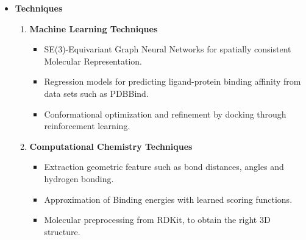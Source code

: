 \documentclass[12pt,a4]{report}
\begin{document}
\begin{itemize}
\begin{enumerate}
\vspace{0.3cm}
\item \textbf{Deployment \& Environment Tools}

\begin{itemize}
    \item \textbf{Docker and Kubernetes:} Support for scalable containerized GPUs deployments.
    \item \textbf{Streamlit:} Helps in the quick deployment of interactive AI web applications.
    \item \textbf{Linux (Ubuntu):} Development \& runtime environment for backend \& AI Models.
\end{itemize}

\vspace{0.3cm}
\item \textbf{Visualization and Documentation Tools}

\begin{itemize}
    \item \textbf{Py3Dmol:} Produces interactive 3D views of docked molecules.
    \item \textbf{Matplotlib / Plotly:} Plots affinity scores, RMSD and performance metrics.
    \item \textbf{LaTeX:} Formats reports and technical documentation, and publication-prepared materials.
\end{itemize}

\end{enumerate}

\vspace{0.5cm}
\item \textbf{Techniques}
\begin{enumerate}

\item \textbf{Machine Learning Techniques}
\begin{itemize}
    \item SE(3)-Equivariant Graph Neural Networks for spatially consistent Molecular Representation.
    \item Regression models for predicting ligand-protein binding affinity from data sets such as PDBBind.
    \item Conformational optimization and refinement by docking through reinforcement learning.
\end{itemize}

\vspace{0.3cm}
\item \textbf{Computational Chemistry Techniques}
\begin{itemize}
    \item Extraction geometric feature such as bond distances, angles and hydrogen bonding.
    \item Approximation of Binding energies with learned scoring functions.
    \item Molecular preprocessing from RDKit, to obtain the right 3D structure.
\end{itemize}


\end{enumerate}
\end{itemize}
\end{document}
